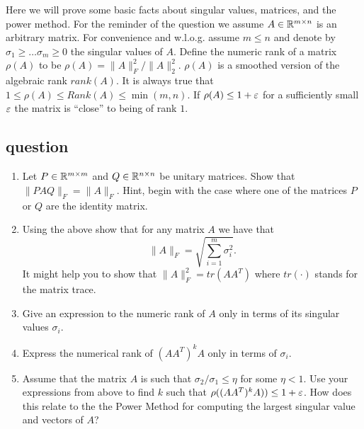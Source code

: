 Here we will prove some basic facts about singular values, matrices, and the power method.
For the reminder of the question we assume $A \in {\mathbb{R}}^{m \times n}$ is an arbitrary matrix.
For convenience and w.l.o.g. assume $m \le n$ and denote by $\sigma_1 \ge \ldots \sigma_m \ge 0$
the singular values of $A$.
Define the numeric rank of a matrix $\rho(A)$ to be $\rho(A) = \|A\|^{2}_{F}/\|A\|^2_2$. $\rho(A)$ is a smoothed
version of the algebraic rank $rank(A)$. It is always true that $1\le \rho(A) \le Rank(A) \le \min(m,n)$.
If $\rho(A) \le 1 +\varepsilon$ for a sufficiently small $\varepsilon$ the matrix is ``close'' to being of rank $1$.

\subsection*{question}

\begin{enumerate}
\item Let $P \in {\mathbb{R}}^{m \times m}$ and $Q \in {\mathbb{R}}^{n \times n}$ be unitary matrices.
Show that $\|PAQ\|_{F} = \|A\|_{F}$.
Hint, begin with the case where one of the matrices $P$ or $Q$ are the identity matrix.
\item Using the above show that for any matrix $A$ we have that 
\[
\|A\|_{F} = \sqrt{\sum_{i=1}^{m}\sigma_{i}^{2}}.
\]
It might help you to show that $\|A\|^{2}_{F} = tr(AA^T)$ where $tr(\cdot)$ stands for the matrix trace.
\item Give an expression to the numeric rank of $A$ only in terms of its singular values $\sigma_i$. 
\item Express the numerical rank of $(AA^T)^{k}A$ only in terms of  $\sigma_i$.
\item Assume that the matrix $A$ is such that $\sigma_2/\sigma_1 \le \eta$ for some $\eta < 1$.
Use your expressions from above to find $k$ such that $\rho((AA^T)^{k}A)) \le  1+ \varepsilon$.
How does this relate to the the Power Method for computing the largest singular value and vectors of $A$?
\end{enumerate}



\pagebreak


